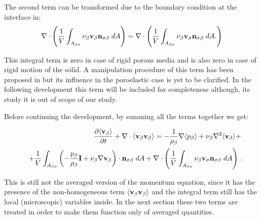 The second term can be transformed due to the boundary condition at the interface in:
$$
\nabla \cdot \left( \dfrac{1}{V} \int_{A_{\beta \sigma}}  \nu_{\beta} \textbf{v}_{\beta} \mathbf{n}_{\sigma \beta} \;dA \right) = \nabla \cdot \left( \dfrac{1}{V} \int_{A_{\beta \sigma}}  \nu_{\beta} \textbf{v}_{\sigma} \mathbf{n}_{\sigma \beta} \;dA. \right)
$$

\noindent This integral term is zero in case of rigid porous media and is also zero in case of rigid motion of the solid. A manipulation procedure of this term has been proposed in \citet{hussong2011continuum} but its influence in the poroelastic case is yet to be clarified. In the following development this term will be included for completeness although, its study it is out of scope of our study.



\noindent Before continuing the development, by summing all the terms together we get:

\begin{eqnarray}
&& \dfrac{\partial {\left< \textbf{v}_{\beta}\right>}}{\partial t} + \nabla \cdot {\left< \textbf{v}_{\beta}\textbf{v}_{\beta}\right>} = -\dfrac{1}{\rho_{\beta}} \nabla {\left< p_{\beta}\right>} + \nu_{\beta}\nabla^2 {\left< \textbf{v}_{\beta} \right>} + \nonumber \\
&& +\dfrac{1}{V} \int_{A_{\beta \sigma}} \left( -\dfrac{p_{\beta}}{\rho_{\beta}} \mathbf{I} + \nu_{\beta} \nabla \textbf{v}_{\beta}  \right)\cdot \mathbf{n}_{\sigma \beta} \;dA +  \nabla \cdot \left( \dfrac{1}{V} \int_{A_{\beta \sigma}}  \nu_{\beta} \textbf{v}_{\sigma} \mathbf{n}_{\sigma \beta} \;dA \right). \nonumber
\label{eq:mom_2}
\end{eqnarray}

This is still not the averaged version of the momentum equation, since it has the presence of the non-homogeneous term ${\left< \textbf{v}_{\beta}\textbf{v}_{\beta} \right>}$ and the integral term still has the local (microscopic) variables inside.
In the next section these two terms are treated in order to make them function only of averaged quantities.

